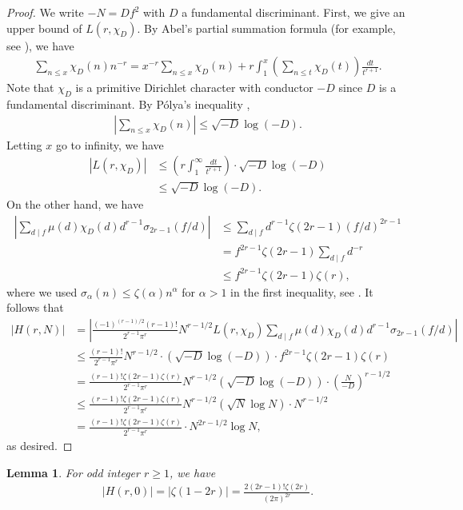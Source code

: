 \documentclass[11pt,letterpaper,reqno]{amsart}
\numberwithin{figure}{section}
\numberwithin{table}{section}
\theoremstyle{definition}
\theoremstyle{plain}
\newtheorem{lemma}[theorem]{Lemma}
\theoremstyle{definition}
\theoremstyle{definition}
\theoremstyle{remark}
\numberwithin{equation}{section}
\theoremstyle{remark}
\begin{document}
\begin{proof}
We write $-N=Df^2$ with $D$ a fundamental discriminant. First, we give an upper bound of $L(r,\chi_D)$. By Abel's partial summation formula (for example, see \cite[Theorem 6.8]{ElementarymethodsNT}), we have 
\begin{align}
    \sum_{n\leq x}\chi_D(n)n^{-r}=x^{-r}\sum_{n\leq x}\chi_D(n)+r\int_{1}^x\left(\sum_{n\leq t}\chi_D(t)\right)\frac{dt}{t^{r+1}}.
\end{align}
Note that $\chi_D$ is a primitive Dirichlet character with conductor $-D$ since $D$ is a fundamental discriminant. By P\'olya's inequality \cite[Theorem 8.21]{ApostolNT},
\begin{align}
    \left|\sum_{n\leq x}\chi_D(n)\right|\leq\sqrt{-D}\log(-D).
\end{align}
Letting $x$ go to infinity, we have
\begin{align}
 |L(r,\chi_D)|&\leq\left(r\int_{1}^{\infty}\frac{dt}{t^{r+1}}\right)\cdot\sqrt{-D}\log(-D)\\&\leq\sqrt{-D}\log(-D).
\end{align}
On the other hand, we have 
\begin{align}
    \left|\sum_{d\mid f}\mu(d)\chi_D(d)d^{r-1}\sigma_{2r-1}(f/d)\right|&\leq\sum_{d\mid f}d^{r-1}\zeta(2r-1)(f/d)^{2r-1}\\&= f^{2r-1}\zeta(2r-1)\sum_{d\mid f}d^{-r}\\&\leq f^{2r-1}\zeta(2r-1)\zeta(r),
\end{align}
where we used $\sigma_{\alpha}(n)\leq\zeta(\alpha)n^{\alpha}$ for $\alpha>1$ in the first inequality, see \cite[p.245, Exercise 9]{ElementarymethodsNT}. It follows that
\begin{align}
    |H(r,N)|&=\left|\frac{(-1)^{(r-1)/2}(r-1)!}{2^{r-1}\pi^r}N^{r-1/2}L(r,\chi_D)\sum_{d\mid f}\mu(d)\chi_D(d)d^{r-1}\sigma_{2r-1}(f/d)\right|\\&\leq\frac{(r-1)!}{2^{r-1}\pi^r}N^{r-1/2}\cdot(\sqrt{-D}\log(-D))\cdot f^{2r-1}\zeta(2r-1)\zeta(r)\\&=\frac{(r-1)!\zeta(2r-1)\zeta(r)}{2^{r-1}\pi^r}N^{r-1/2}(\sqrt{-D}\log(-D))\cdot\left(\frac{N}{-D}\right)^{r-1/2}\\&\leq \frac{(r-1)!\zeta(2r-1)\zeta(r)}{2^{r-1}\pi^r}N^{r-1/2}(\sqrt{N}\log N)\cdot N^{r-1/2}\\&=\frac{(r-1)!\zeta(2r-1)\zeta(r)}{2^{r-1}\pi^r}\cdot N^{2r-1/2}\log N,
\end{align}
as desired.
\end{proof}
\begin{lemma}\label{lem:zetavaluesatoddnegative}
For odd integer $r\geq1$, we have
\begin{align}
    |H(r,0)|=|\zeta(1-2r)|=\frac{2(2r-1)!\zeta(2r)}{(2\pi)^{2r}}.
\end{align}
\end{lemma}
\end{document}
